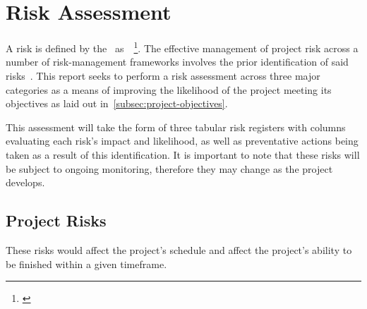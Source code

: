 
\thispagestyle{plain}
\newpage
\section{Risk Assessment}\label{sec:risk-assessment}

\normalsize

A risk is defined by the~\citet{pmi_2021} as~~\footnote{\citep{pmi_2021}}.
The effective management of project risk across a number of risk-management frameworks involves the prior identification of said risks~\citep{goman_risk}.
This report seeks to perform a risk assessment across three major categories as a means of improving the likelihood of the project meeting its objectives as laid out in~\ref{subsec:project-objectives}.

This assessment will take the form of three tabular risk registers with columns evaluating each risk’s impact and likelihood, as well as preventative actions being taken as a result of this identification.
It is important to note that these risks will be subject to ongoing monitoring, therefore they may change as the project develops.

\subsection{Project Risks}\label{subsec:project-risks}

These risks would affect the project’s schedule and affect the project’s ability to be finished within a given timeframe.

